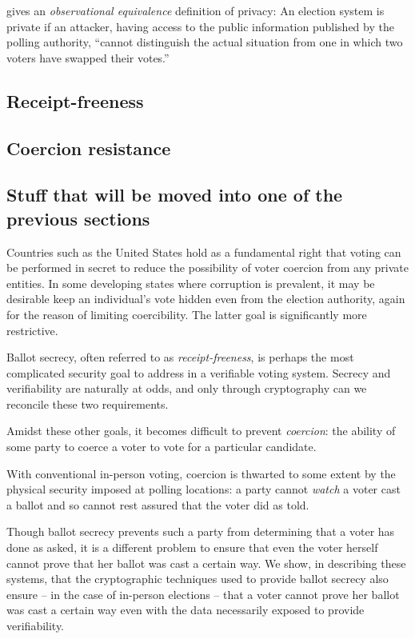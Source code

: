 \documentclass[10pt,twocolumn]{article}
\newcommand{\term}[1]{\textit{#1}}
\begin{document}
\cite{kremer} gives an \term{observational equivalence} definition of privacy:
An election system is private if an attacker, having access to the public
information published by the polling authority, ``cannot distinguish
the actual situation from one in which two voters have swapped their votes.''


\subsection{Receipt-freeness}

\subsection{Coercion resistance}

\subsection{Stuff that will be moved into one of the previous sections}

Countries such as the United States hold as a fundamental right that voting can be performed
in secret to reduce the possibility of voter coercion from any private entities.
In some developing states where corruption is prevalent, it may be desirable keep an
individual's vote hidden even from the election authority, again for the reason of
limiting coercibility. The latter goal is significantly more restrictive.

Ballot secrecy, often referred to as \term{receipt-freeness}, is perhaps the most complicated
security goal to address in a verifiable voting system.
Secrecy and verifiability are naturally at odds, and only through cryptography can we
reconcile these two requirements.

Amidst these other goals, it becomes difficult to prevent \term{coercion}: the ability of some party
to coerce a voter to vote for a particular candidate.

With conventional in-person voting, coercion is thwarted to some extent by the physical security
imposed at polling locations: a party cannot \emph{watch} a voter cast a ballot and so cannot rest
assured that the voter did as told.

Though ballot secrecy prevents such a party from determining that a voter has done as asked, it is a
different problem to ensure that even the voter herself cannot prove that her ballot was
cast a certain way. We show, in describing these systems, that the cryptographic techniques
used to provide ballot secrecy also ensure -- in the case of in-person elections -- that a voter
cannot prove her ballot was cast a certain way even with the data necessarily exposed to provide
verifiability.
\end{document}
